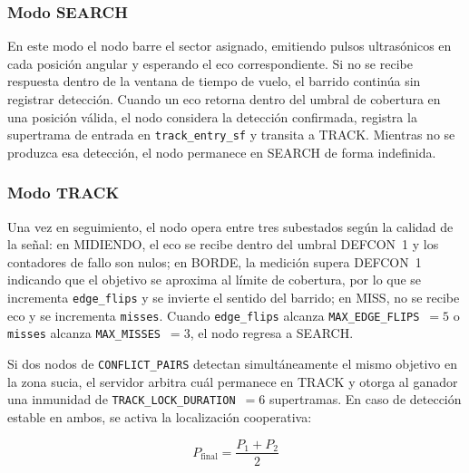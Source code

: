 
\subsubsection*{Modo SEARCH}

En este modo el nodo barre el sector asignado, emitiendo pulsos ultrasónicos en cada posición angular y esperando el eco correspondiente. Si no se recibe respuesta dentro de la ventana de tiempo de vuelo, el barrido continúa sin registrar detección. Cuando un eco retorna dentro del umbral de cobertura en una posición válida, el nodo considera la detección confirmada, registra la supertrama de entrada en \texttt{track\_entry\_sf} y transita a TRACK. Mientras no se produzca esa detección, el nodo permanece en SEARCH de forma indefinida.

\subsubsection*{Modo TRACK}

Una vez en seguimiento, el nodo opera entre tres subestados según la calidad de la señal: en MIDIENDO, el eco se recibe dentro del umbral DEFCON~1 y los contadores de fallo son nulos; en BORDE, la medición supera DEFCON~1 indicando que el objetivo se aproxima al límite de cobertura, por lo que se incrementa \texttt{edge\_flips} y se invierte el sentido del barrido; en MISS, no se recibe eco y se incrementa \texttt{misses}. Cuando \texttt{edge\_flips} alcanza \texttt{MAX\_EDGE\_FLIPS}~$= 5$ o \texttt{misses} alcanza \texttt{MAX\_MISSES}~$= 3$, el nodo regresa a SEARCH.

Si dos nodos de \texttt{CONFLICT\_PAIRS} detectan simultáneamente el mismo objetivo en la zona sucia, el servidor arbitra cuál permanece en TRACK y otorga al ganador una inmunidad de \texttt{TRACK\_LOCK\_DURATION}~$= 6$ supertramas. En caso de detección estable en ambos, se activa la localización cooperativa:

\begin{equation}
P_{\text{final}} = \frac{P_1 + P_2}{2}
\label{eq:localizacion}
\end{equation}


